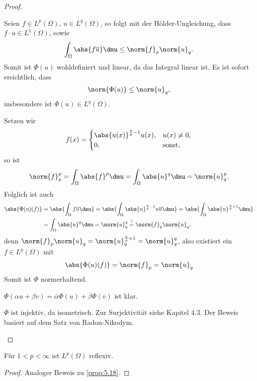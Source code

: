 \begin{proof}
\begin{proofenum}
\item Seien $f\in L^p(\Omega)$, $u\in L^q(\Omega)$, so folgt mit der
Hölder-Ungleichung, dass $f\cdot \overline{u}\in L^1(\Omega)$, sowie
\begin{align*}
\int_\Omega \abs{f\overline{u}}\dmu \le \norm{f}_p \norm{u}_q.
\end{align*}
Somit ist $\Phi(u)$ wohldefiniert und linear, da das Integral linear ist. Es ist
sofort ersichtlich, dass
\begin{align*}
\norm{\Phi(u)} \le \norm{u}_q,
\end{align*}
insbesondere ist $\Phi(u)\in L^q(\Omega)$.
\item Setzen wir
\begin{align*}
f(x) = 
\begin{cases}
\abs{u(x)}^{\frac{q}{p}-1}u(x), & u(x)\neq 0,\\
0, & \text{sonst},
\end{cases}
\end{align*}
so ist 
\begin{align*}
\norm{f}_p^p = \int_\Omega \abs{f}^p \dmu = \int_\Omega \abs{u}^q \dmu =
\norm{u}_q^p.
\end{align*}
Folglich ist auch
\begin{align*}
\abs{\Phi(u)(f)} &= \abs{\int_\Omega f\overline{u}\dmu}
=
\abs{\int_\Omega \abs{u}^{\frac{q}{p}-1} u\overline{u}\dmu}
= 
\abs{\int_\Omega \abs{u}^{\frac{q}{p}+1}\dmu}\\
&=
\int_\Omega \abs{u}^{q}\dmu
= \norm{u}_q^q \overset{!}{=}\norm{f}_p\norm{u}_q,
\end{align*}
denn $\norm{f}_p\norm{u}_q = \norm{u}_q^{\frac{q}{p}+1} = \norm{u}_q^q$, also
existiert ein $f\in L^p(\Omega)$ mit
\begin{align*}
\abs{\Phi(u)(f)} = \norm{f}_p=\norm{u}_q
\end{align*}
Somit ist $\Phi$ normerhaltend.
\item $\Phi(\alpha u + \beta v) = \overline{\alpha}\Phi(u) +
\overline{\beta}\Phi(v)$ ist klar.
\item $\Phi$ ist injektiv, da isometrisch. Zur Surjektivität siehe \cite{Alt99}
Kapitel 4.3. Der Beweis basiert auf dem Satz von Radon-Nikodym.\qedhere
\end{proofenum}
\end{proof}

\begin{cor}
\label{prop:7.22}
Für $1<p<\infty$ ist $L^p(\Omega)$ reflexiv.\fishhere
\end{cor}
\begin{proof}
Analoger Beweis zu \ref{prop:5.18}.\qedhere
\end{proof}


